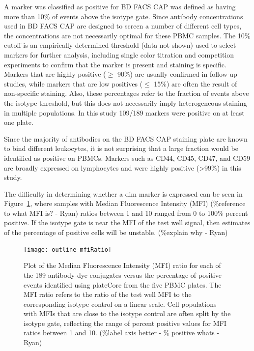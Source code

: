 \documentclass[12pt]{article}
\begin{document}
A marker was classified as positive for BD FACS CAP was defined as having more
than 10\% of events above the isotype gate. Since antibody concentrations used
in BD FACS CAP are designed to screen a number of different cell types, the
concentrations are not necessarily optimal for these PBMC samples. The 10\%
cutoff is an empirically determined threshold (data not shown) used to select
markers for further analysis, including single color titration and competition
experiments to confirm that the marker is present and staining is specific.
Markers that are highly positive ($\ge$ 90\%) are usually confirmed in
follow-up studies, while markers that are low positives ($\le$ 15\%) are often
the result of non-specific staining. Also, these percentages refer to the
fraction of events above the isotype threshold, but this does not necessarily
imply heterogeneous staining in multiple populations. In this study 109/189
markers were positive on at least one plate.

Since the majority of antibodies on the BD FACS CAP staining plate are known to
bind different leukocytes, it is not surprising that a large fraction would be
identified as positive on PBMCs.  Markers such as CD44, CD45, CD47, and CD59
are broadly expressed on lymphocytes and were highly positive (>99\%) in this
study. 

The difficulty in determining whether a dim marker is expressed can be seen in
Figure~\ref{fig:mfiRatio}, where samples with Median Fluorescence Intensity
(MFI) (\%reference to what MFI is? - Ryan) ratios between 1 and 10 ranged from
0 to 100\% percent positive. If the isotype gate is near the MFI of the test
well signal, then estimates of the percentage of positive cells will be
unstable. (\%explain why - Ryan)




\clearpage
\begin{figure}
\centering
\texttt{[image: outline-mfiRatio]}
\caption{Plot of the Median Fluorescence Intensity (MFI) ratio for each of the
189 antibody-dye conjugates versus the percentage of positive events identified
using plateCore from the five PBMC plates. The MFI ratio refers to the ratio of
the test well MFI to the corresponding isotype control on a linear scale. Cell
populations with MFIs that are close to the isotype control are often split by
the isotype gate, reflecting the range of percent positive values for MFI
ratios between 1 and 10. (\%label axis better - \% positive whats - Ryan)}
\label{fig:mfiRatio}
\end{figure}
\end{document}
